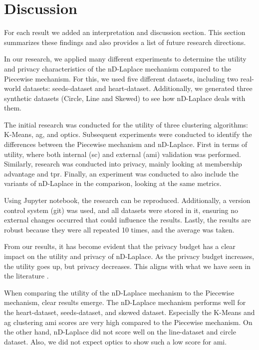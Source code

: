 \chapter{Discussion}
For each result we added an interpretation and discussion section. This section summarizes these findings and also provides a list of future research directions.

In our research, we applied many different experiments to determine the utility and privacy characteristics of the nD-Laplace mechanism compared to the Piecewise mechanism. For this, we used five different datasets, including two real-world datasets: seeds-dataset and heart-dataset. Additionally, we generated three synthetic datasets (Circle, Line and Skewed) to see how nD-Laplace deals with them.

The initial research was conducted for the utility of three clustering algorithms: K-Means, \gls{ag}, and \gls{optics}. Subsequent experiments were conducted to identify the differences between the Piecewise mechanism and nD-Laplace. First in terms of utility, where both internal (\gls{sc}) and external (\gls{ami}) validation was performed. Similarly, research was conducted into privacy, mainly looking at membership advantage and \gls{tpr}.
Finally, an experiment was conducted to also include the variants of nD-Laplace in the comparison, looking at the same metrics. \newline

Using Jupyter notebook, the research can be reproduced. 
Additionally, a version control system (git) was used, and all datasets were stored in it, ensuring no external changes occurred that could influence the results.
Lastly, the results are robust because they were all repeated 10 times, and the average was taken. \newline

From our results, it has become evident that the privacy budget has a clear impact on the utility and privacy of nD-Laplace.
As the privacy budget increases, the utility goes up, but privacy decreases.
This aligns with what we have seen in the literature \citep{sun_distributed_2019, xia_distributed_2020, 9679364}. 

When comparing the utility of the nD-Laplace mechanism to the Piecewise mechanism, clear results emerge. The nD-Laplace mechanism performs well for the heart-dataset, seeds-dataset, and skewed dataset. Especially the K-Means and \gls{ag} clustering \gls{ami} scores are very high compared to the Piecewise mechanism. On the other hand, nD-Laplace did not score well on the line-dataset and circle dataset.
Also, we did not expect \gls{optics} to show such a low score for \gls{ami}. \newline

